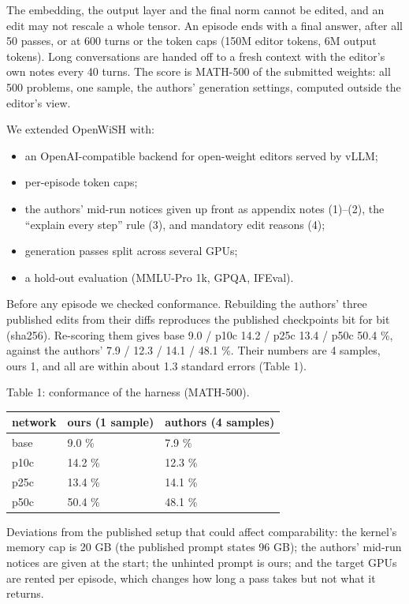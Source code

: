 \documentclass[
  10pt,
]{article}
\newcounter{none} %
\providecommand{\tightlist}{%
  \setlength{\itemsep}{0pt}\setlength{\parskip}{0pt}}
\begin{document}
The embedding, the output layer and the final norm cannot be edited, and
an edit may not rescale a whole tensor. An episode ends with a final
answer, after all 50 passes, or at 600 turns or the token caps (150M
editor tokens, 6M output tokens). Long conversations are handed off to a
fresh context with the editor's own notes every 40 turns. The score is
MATH-500 of the submitted weights: all 500 problems, one sample, the
authors' generation settings, computed outside the editor's view.

We extended OpenWiSH with:

\begin{itemize}
\tightlist
\item
  an OpenAI-compatible backend for open-weight editors served by vLLM;
\item
  per-episode token caps;
\item
  the authors' mid-run notices given up front as appendix notes
  (1)--(2), the ``explain every step'' rule (3), and mandatory edit
  reasons (4);
\item
  generation passes split across several GPUs;
\item
  a hold-out evaluation (MMLU-Pro 1k, GPQA, IFEval).
\end{itemize}

Before any episode we checked conformance. Rebuilding the authors' three
published edits from their diffs reproduces the published checkpoints
bit for bit (sha256). Re-scoring them gives base 9.0 / p10c 14.2 / p25c
13.4 / p50c 50.4 \%, against the authors' 7.9 / 12.3 / 14.1 / 48.1 \%.
Their numbers are 4 samples, ours 1, and all are within about 1.3
standard errors (Table 1).

Table 1: conformance of the harness (MATH-500).

{\def\LTcaptype{none} %
\begin{longtable}[]{@{}lll@{}}
\toprule\noalign{}
network & ours (1 sample) & authors (4 samples) \\
\midrule\noalign{}
\endhead
\bottomrule\noalign{}
\endlastfoot
base & 9.0 \% & 7.9 \% \\
p10c & 14.2 \% & 12.3 \% \\
p25c & 13.4 \% & 14.1 \% \\
p50c & 50.4 \% & 48.1 \% \\
\end{longtable}
}

Deviations from the published setup that could affect comparability: the
kernel's memory cap is 20 GB (the published prompt states 96 GB); the
authors' mid-run notices are given at the start; the unhinted prompt is
ours; and the target GPUs are rented per episode, which changes how long
a pass takes but not what it returns.
\end{document}
